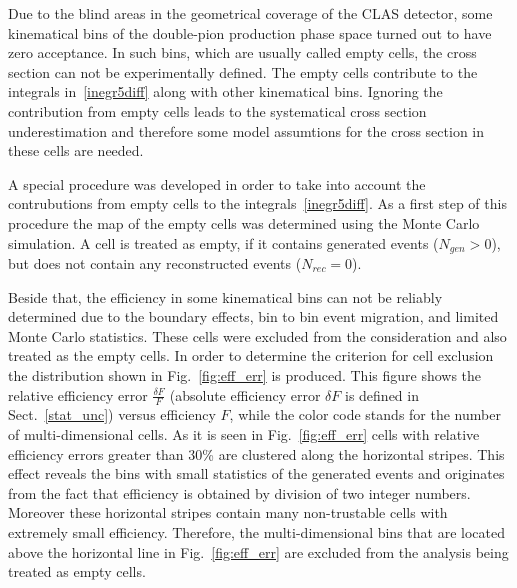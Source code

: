\documentclass[prc,twocolumn,superscriptaddress,showpacs,amssymb,amsmath,amsfonts,linenumbers,aps]{revtex4-1}
\begin{document}




Due to the blind areas in the geometrical coverage of the CLAS detector, some kinematical bins of the double-pion production phase space turned out to have zero acceptance. 
In such bins, which are usually called empty cells,  the cross section can not be experimentally defined. The empty cells contribute to the integrals in~\eqref{inegr5diff} along with other kinematical bins.  Ignoring the contribution from empty cells leads to the systematical cross section underestimation and therefore some model assumtions for the cross section in these cells are needed. 

A special procedure was developed in order to take into account the contrubutions from empty cells to the integrals~\eqref{inegr5diff}.
As a first step of this procedure the map of the empty cells was determined using the Monte Carlo simulation. A cell is treated as empty, if it contains generated events ($N_{gen} > 0$), but does not contain any reconstructed events ($N_{rec} = 0$). 

Beside that, the efficiency in some kinematical bins can not be reliably determined due to the boundary effects, bin to bin event migration, and limited Monte Carlo statistics.  
These cells were excluded from the consideration and also treated as the empty cells.
In order to determine the criterion for cell exclusion the distribution shown in Fig.~\ref{fig:eff_err} is produced.
This figure shows the relative efficiency error $\frac{\delta F}{F}$ (absolute efficiency error $\delta F$ is defined in Sect.~\ref{stat_unc})  versus efficiency $F$, while the color code stands for the number of multi-dimensional cells. As it is seen in  Fig.~\ref{fig:eff_err} cells with relative efficiency errors greater than 30\% are clustered along the horizontal stripes. This effect  reveals the bins with small statistics of the generated events and originates from the fact that efficiency is obtained by division of two integer numbers. Moreover these horizontal stripes contain many non-trustable cells with extremely small efficiency. Therefore,  the multi-dimensional bins that are located above the horizontal  line in Fig.~\ref{fig:eff_err} are excluded from the analysis being treated as empty cells.
\end{document}
